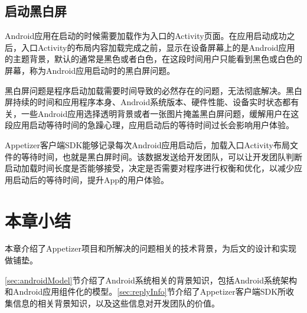 
\subsection{启动黑白屏}

Android应用在启动的时候需要加载作为入口的Activity页面。在应用启动成功之后，入口Activity的布局内容加载完成之前，显示在设备屏幕上的是Android应用的主题背景，默认的通常是黑色或者白色，在这段时间用户只能看到黑色或白色的屏幕，称为Android应用启动时的黑白屏问题。

黑白屏问题是程序启动加载需要时间导致的必然存在的问题，无法彻底解决。黑白屏持续的时间和应用程序本身、Android系统版本、硬件性能、设备实时状态都有关，一些Android应用选择透明背景或者一张图片掩盖黑白屏问题，缓解用户在这段应用启动等待时间的急躁心理，应用启动后的等待时间过长会影响用户体验。

Appetizer客户端SDK能够记录每次Android应用启动后，加载入口Activity布局文件的等待时间，也就是黑白屏时间。该数据发送给开发团队，可以让开发团队判断启动加载时间长度是否能够接受，决定是否需要对程序进行权衡和优化，以减少应用启动后的等待时间，提升App的用户体验。

\section{本章小结}

本章介绍了Appetizer项目和所解决的问题相关的技术背景，为后文的设计和实现做铺垫。

\ref{sec:androidModel}节介绍了Android系统相关的背景知识，包括Android系统架构和Android应用组件化的模型。\ref{sec:replyInfo}节介绍了Appetizer客户端SDK所收集信息的相关背景知识，以及这些信息对开发团队的价值。
